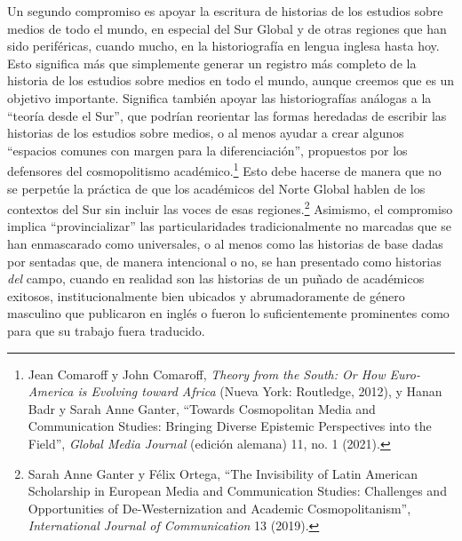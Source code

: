 \documentclass{tufte-handout}
\begin{document}
Un segundo compromiso es apoyar la escritura de historias de los
estudios sobre medios de todo el mundo, en especial del Sur Global y de
otras regiones que han sido periféricas, cuando mucho, en la
historiografía en lengua inglesa hasta hoy. Esto significa más que
simplemente generar un registro más completo de la historia de los
estudios sobre medios en todo el mundo, aunque creemos que es un
objetivo importante. Significa también apoyar las historiografías
análogas a la ``teoría desde el Sur'', que podrían reorientar las formas
heredadas de escribir las historias de los estudios sobre medios, o al
menos ayudar a crear algunos ``espacios comunes con margen para la
diferenciación'', propuestos por los defensores del cosmopolitismo
académico.\footnote{Jean Comaroff y John Comaroff, \emph{Theory from the
  South: Or How Euro-America is Evolving toward Africa} (Nueva York:
  Routledge, 2012), y Hanan Badr y Sarah Anne Ganter, ``Towards
  Cosmopolitan Media and Communication Studies: Bringing Diverse
  Epistemic Perspectives into the Field'', \emph{Global Media Journal}
  (edición alemana) 11, no. 1 (2021).} Esto debe hacerse de manera que
no se perpetúe la práctica de que los académicos del Norte Global hablen
de los contextos del Sur sin incluir las voces de esas
regiones.\footnote{Sarah Anne Ganter y Félix Ortega, ``The Invisibility
  of Latin American Scholarship in European Media and Communication
  Studies: Challenges and Opportunities of De-Westernization and
  Academic Cosmopolitanism'', \emph{International Journal of
  Communication} 13 (2019).} Asimismo, el compromiso implica
``provincializar'' las particularidades tradicionalmente no marcadas que
se han enmascarado como universales, o al menos como las historias de
base dadas por sentadas que, de manera intencional o no, se han
presentado como historias \emph{del} campo, cuando en realidad son las
historias de un puñado de académicos exitosos, institucionalmente bien
ubicados y abrumadoramente de género masculino que publicaron en inglés
o fueron lo suficientemente prominentes como para que su trabajo fuera
traducido.
\end{document}
